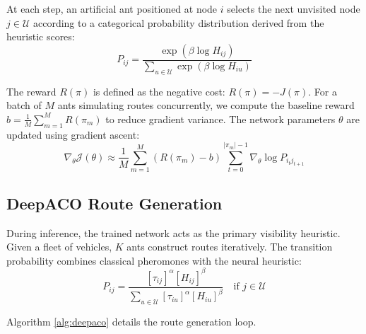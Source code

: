 \documentclass[conference]{IEEEtran}
\begin{document}
At each step, an artificial ant positioned at node $i$ selects the next unvisited node $j \in \mathcal{U}$ according to a categorical probability distribution derived from the heuristic scores:
\begin{equation}
    P_{ij} = \frac{\exp(\beta \log H_{ij})}{\displaystyle \sum_{u \in \mathcal{U}} \exp(\beta \log H_{iu})}
\end{equation}

The reward $R(\pi)$ is defined as the negative cost: $R(\pi) = -J(\pi)$. For a batch of $M$ ants simulating routes concurrently, we compute the baseline reward $b = \frac{1}{M} \sum_{m=1}^{M} R(\pi_m)$ to reduce gradient variance. The network parameters $\theta$ are updated using gradient ascent:
\begin{equation}
    \nabla_\theta \mathcal{J}(\theta) \approx \frac{1}{M} \sum_{m=1}^{M} \left( R(\pi_m) - b \right) \sum_{t=0}^{|\pi_m|-1} \nabla_\theta \log P_{i_t j_{t+1}}
\end{equation}

\subsection{DeepACO Route Generation}
During inference, the trained network acts as the primary visibility heuristic. Given a fleet of vehicles, $K$ ants construct routes iteratively. The transition probability combines classical pheromones with the neural heuristic:
\begin{equation}
    P_{ij} = \frac{[\tau_{ij}]^\alpha [H_{ij}]^\beta}{\displaystyle \sum_{u \in \mathcal{U}} [\tau_{iu}]^\alpha [H_{iu}]^\beta} \quad \text{if } j \in \mathcal{U}
\end{equation}

Algorithm \ref{alg:deepaco} details the route generation loop.
\end{document}
